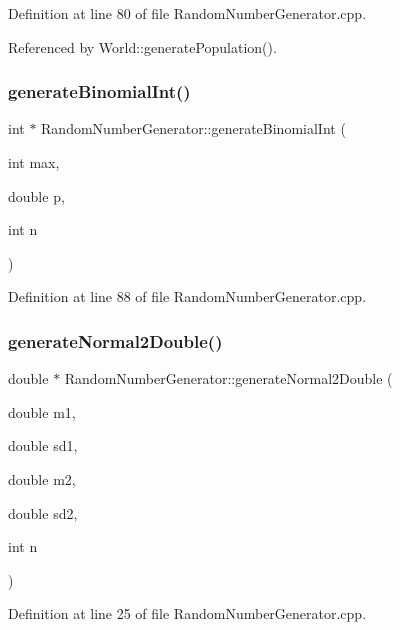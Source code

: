 Definition at line 80 of file Random\+Number\+Generator.\+cpp.



Referenced by World\+::generate\+Population().

\mbox{\label{class_random_number_generator_a5d0d41c12508d3145af5463669b1c4d2}} 
\subsubsection{generateBinomialInt()\hspace{0.1cm}{\footnotesize\ttfamily [2/2]}}
{\footnotesize\ttfamily int $\ast$ Random\+Number\+Generator\+::generate\+Binomial\+Int (\begin{DoxyParamCaption}\item[{int}]{max,  }\item[{double}]{p,  }\item[{int}]{n }\end{DoxyParamCaption})}



Definition at line 88 of file Random\+Number\+Generator.\+cpp.

\mbox{\label{class_random_number_generator_a15aca1c8c686a9e084e7d9e56bb0f9b4}} 
\subsubsection{generateNormal2Double()}
{\footnotesize\ttfamily double $\ast$ Random\+Number\+Generator\+::generate\+Normal2\+Double (\begin{DoxyParamCaption}\item[{double}]{m1,  }\item[{double}]{sd1,  }\item[{double}]{m2,  }\item[{double}]{sd2,  }\item[{int}]{n }\end{DoxyParamCaption})}



Definition at line 25 of file Random\+Number\+Generator.\+cpp.



